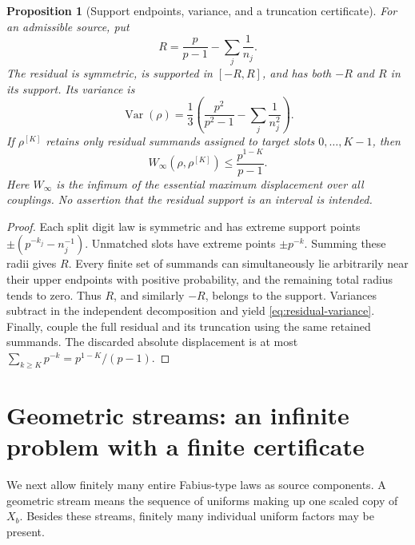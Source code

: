 \documentclass[11pt,a4paper]{article}
\newtheorem{proposition}[theorem]{Proposition}
\theoremstyle{remark}
\DeclareMathOperator{\Var}{Var}
\begin{document}
\begin{proposition}[Support endpoints, variance, and a truncation certificate]
\label{prop:residual-bounds}
For an admissible source, put
\[
 R=\frac{p}{p-1}-\sum_j\frac1{n_j}.
\]
The residual is symmetric, is supported in $[-R,R]$, and has both $-R$ and $R$
in its support. Its variance is
\begin{equation}
 \Var(\rho)=\frac13\left(\frac{p^2}{p^2-1}-\sum_j\frac1{n_j^2}\right).
 \label{eq:residual-variance}
\end{equation}
If $\rho^{[K]}$ retains only residual summands assigned to target slots
$0,\ldots,K-1$, then
\begin{equation}
 W_\infty(\rho,\rho^{[K]})\le\frac{p^{1-K}}{p-1}.
 \label{eq:winfty}
\end{equation}
Here $W_\infty$ is the infimum of the essential maximum displacement over all
couplings. No assertion that the residual support is an interval is intended.
\end{proposition}
\begin{proof}
Each split digit law is symmetric and has extreme support points
$\pm(p^{-k_j}-n_j^{-1})$. Unmatched slots have extreme points $\pm p^{-k}$.
Summing these radii gives $R$. Every finite set of summands can simultaneously
lie arbitrarily near their upper endpoints with positive probability, and the
remaining total radius tends to zero. Thus $R$, and similarly $-R$, belongs to
the support. Variances subtract in the independent decomposition and yield
\eqref{eq:residual-variance}. Finally, couple the full residual and its truncation
using the same retained summands. The discarded absolute displacement is at
most $\sum_{k\ge K}p^{-k}=p^{1-K}/(p-1)$.
\end{proof}

\section{Geometric streams: an infinite problem with a finite certificate}
\label{sec:streams}

We next allow finitely many entire Fabius-type laws as source components. A
geometric stream means the sequence of uniforms making up one scaled copy of
$X_b$. Besides these streams, finitely many individual uniform factors may be
present.
\end{document}
